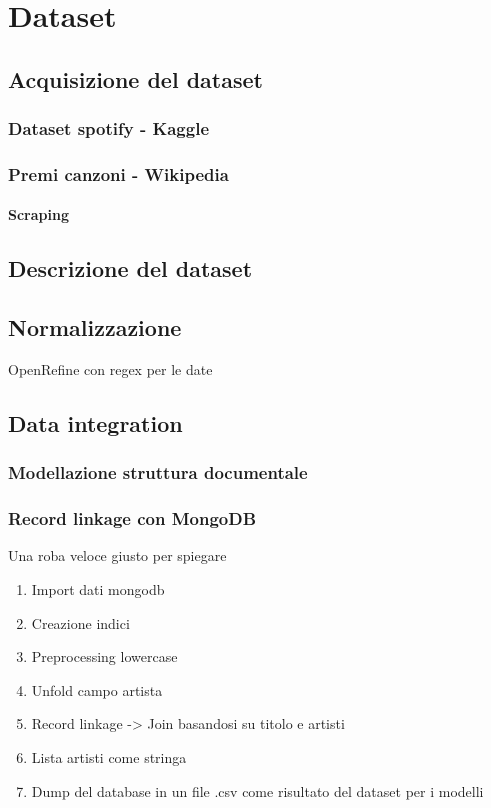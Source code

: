 \chapter{Dataset}

\section{Acquisizione del dataset}
\subsection{Dataset spotify - Kaggle}
\subsection{Premi canzoni - Wikipedia}
\subsubsection{Scraping}


\section{Descrizione del dataset}

\section{Normalizzazione}
OpenRefine con regex per le date

\section{Data integration}
\subsection{Modellazione struttura documentale}
\subsection{Record linkage con MongoDB}
Una roba veloce giusto per spiegare

\begin{enumerate}
	\item Import dati mongodb
	\item Creazione indici
	\item Preprocessing lowercase
	\item Unfold campo artista
	\item Record linkage -> Join basandosi su titolo e artisti
	\item Lista artisti come stringa
	\item Dump del database in un file .csv come risultato del dataset per i modelli
\end{enumerate}



